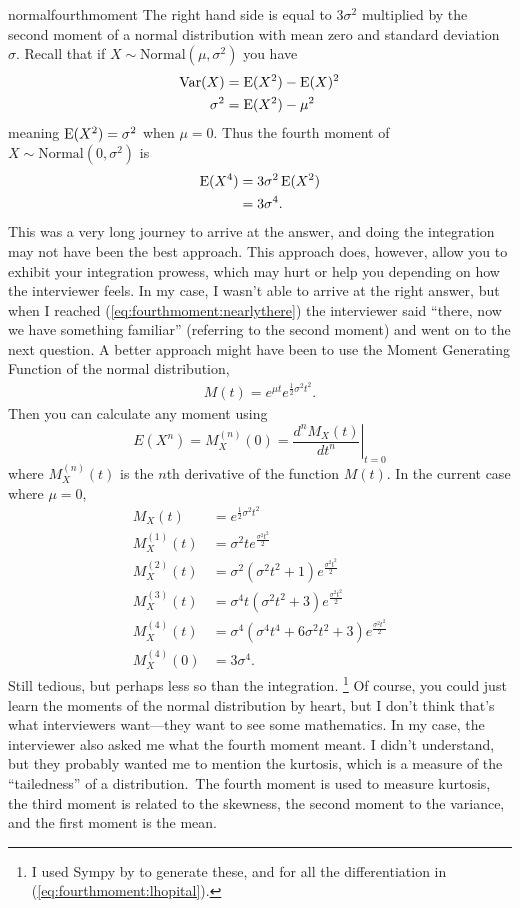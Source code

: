 \begin{answer}{normalfourthmoment}
The right hand side is equal to $3\sigma^2$ multiplied by the second moment of a normal distribution with mean zero and standard deviation $\sigma$.
Recall that if $X \sim \text{Normal}(\mu, \sigma^2)$ you have
\begin{align*}
  \operatorname{\mathrm{Var}}(X) &= \operatorname{\mathrm{E}}(X^2) - \operatorname{\mathrm{E}}(X)^2 \\
\sigma^2  &= \operatorname{\mathrm{E}}(X^2) - \mu^2
\end{align*}
meaning
$ \operatorname{\mathrm{E}}(X^2) = \sigma^2 $
when
$\mu=0$.
Thus the fourth moment of
$X \sim \text{Normal}\left(0, \sigma^2\right)$ is
\begin{align*}
\operatorname{\mathrm{E}}(X^4)
&=
3 \sigma^2 \operatorname{\mathrm{E}}(X^2)
\\&=
3 \sigma^4
\text{.}
\end{align*}
This was a very long journey to arrive at the answer, and doing the integration may not have been the best approach.
This approach does, however, allow you to exhibit your integration prowess, which may hurt or help you depending on how the interviewer feels.
In my case, I wasn't able to arrive at the right answer, but when I reached  (\ref{eq:fourthmoment:nearlythere}) the interviewer said ``there, now we have something familiar'' (referring to the second moment) and went on to the next question.
A better approach might have been to use the Moment Generating Function of the normal distribution,
\begin{align*}
  M(t) =
  e^{\mu t}
  e^{\frac{1}{2}\sigma^2 t^2}
  \text{.}
\end{align*}
Then you can calculate any moment using
\[
E \left( X^n \right) = M_X^{(n)}(0) = \left. \frac{d^n M_X (t)}{dt^n}\right|_{t=0}
\]
where $M_X^{(n)}(t)$ is the $n$th derivative of the function $M(t)$.
In the current case where $\mu=0$,
\begin{align*}
  M_X(t) &=
  e^{\frac{1}{2}\sigma^2 t^2}\\
M_X^{(1)}(t) &=
\sigma^{2} t e^{\frac{\sigma^{2} t^{2}}{2}}
\\
M_X^{(2)}(t) &=
\sigma^{2} \left(\sigma^{2} t^{2} + 1\right) e^{\frac{\sigma^{2} t^{2}}{2}}
\\
M_X^{(3)}(t) &=
\sigma^{4} t \left(\sigma^{2} t^{2} + 3\right) e^{\frac{\sigma^{2} t^{2}}{2}}
\\
M_X^{(4)}(t) &=
\sigma^{4} \left(\sigma^{4} t^{4} + 6 \sigma^{2} t^{2} + 3\right) e^{\frac{\sigma^{2} t^{2}}{2}}
\\
M_X^{(4)}(0) &=
3\sigma^{4}
\text{.}
\end{align*}
Still tedious, but perhaps less so than the integration.%
\footnote{I used Sympy by \citet{Sympy} to generate these, and for all the differentiation in (\ref{eq:fourthmoment:lhopital}).}
Of course, you could just learn the moments of the normal distribution by heart, but I don't think that's what interviewers want---they want to see some mathematics.
In my case, the interviewer also asked me what the fourth moment meant.
I didn't understand, but they probably wanted me to mention the kurtosis, which is a measure of the ``tailedness'' of a distribution.\
The fourth moment is used to measure kurtosis,
the third moment is related to the skewness,
the second moment to the variance, and the first moment is the mean.


\end{answer}
